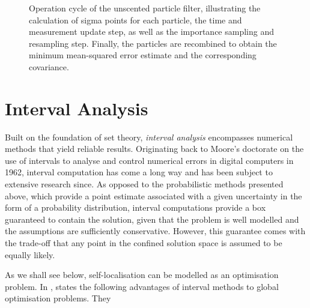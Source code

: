 \begin{figure}
\caption[Operation cycle of the unscented particle filter.]{Operation cycle of the unscented particle filter, illustrating the calculation of sigma points for each particle, the time and measurement update step, as well as the importance sampling and resampling step. Finally, the particles are recombined to obtain the minimum mean-squared error estimate and the corresponding covariance.} \label{fig:unscented_particle_filter_cycle}
\end{figure}



\section{Interval Analysis}

Built on the foundation of set theory, \emph{interval analysis} encompasses numerical methods that yield reliable results. Originating back to Moore's doctorate on the use of intervals to analyse and control numerical errors in digital computers in 1962, interval computation has come a long way and has been subject to extensive research since.  As opposed to the probabilistic methods presented above, which provide a point estimate associated with a given uncertainty in the form of a probability distribution, interval computations provide a box guaranteed to contain the solution, given that the problem is well modelled and the assumptions are sufficiently conservative. However, this guarantee comes with the trade-off that any point in the confined solution space is assumed to be equally likely. 


As we shall see below, self-localisation can be modelled as an optimisation problem. In \cite{Rokne2001}, \citeauthor{Rokne2001} states the following advantages of interval methods to global optimisation problems. They

